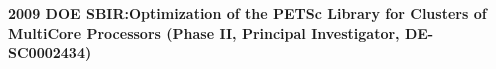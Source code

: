 \begin{itemize}
 	\textbf{2009 DOE SBIR:Optimization of the PETSc Library for
 		Clusters of MultiCore Processors (Phase II, Principal
 		Investigator, DE-SC0002434)}
 	
 	
 	
 	
 	
 	

\end{itemize}
